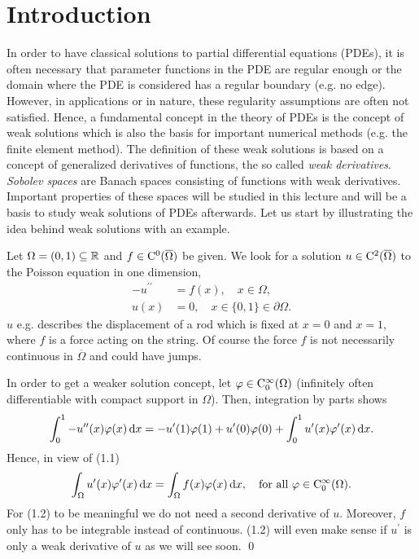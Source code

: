 \chapter{Introduction}

In order to have classical solutions to partial differential equations (PDEs), it is often necessary that parameter functions in the PDE are regular enough or the domain where the PDE is considered has a regular boundary (e.g. no edge).
However, in applications or in nature, these regularity assumptions are often not satisfied.
Hence, a fundamental concept in the theory of PDEs is the concept of weak solutions which is also the basis for important numerical methods (e.g. the finite element method).
The definition of these weak solutions is based on a concept of generalized derivatives of functions, the so called \emph{weak derivatives}. \emph{Sobolev spaces} are Banach spaces consisting of functions with weak derivatives.  
Important properties of these spaces will be studied in this lecture and will be a basis to study weak solutions of PDEs afterwards.  
Let us start by illustrating the idea behind weak solutions with an example.

\begin{ex}
  Let $\Omega = (0,1) \subseteq \mathbb{R}$ and $f \in \mathrm{C}^0(\overline \Omega)$ be given. 
  We look for a solution $u \in \mathrm{C}^2(\overline \Omega)$ to the Poisson equation in one dimension,
  \begin{align}
    -u^{\prime\prime} &= f(x), \quad x \in \Omega, \\
    u(x) &= 0, \quad x \in \{0,1\} \in \partial \Omega \nonumber.
  \end{align}
  $u$ e.g. describes the displacement of a rod which is fixed at $x = 0$ and $x = 1$, where $f$ is a force acting on the string.
  Of course the force $f$ is not necessarily continuous in $\overline\Omega$ and could have jumps.

  In order to get a weaker solution concept, let $\varphi \in \mathrm{C}_0^\infty(\Omega)$ (infinitely often differentiable with compact support in $\Omega$).
  Then, integration by parts shows
  $$
  \int_0^1 -u^{\prime\prime}(x) \varphi(x) \, {\operatorname{d}\!{x}} = -u^\prime(1) \varphi(1) + u^\prime(0)\varphi(0) + \int_0^1 u^\prime(x)\varphi^\prime(x) \, {\operatorname{d}\!{x}}.
  $$
  Hence, in view of (1.1)
  \begin{equation}
    \int_\Omega u^\prime(x)\varphi^\prime(x) \, {\operatorname{d}\!{x}} = \int_\Omega f(x)\varphi(x) \, {\operatorname{d}\!{x}}, \quad \text{for all } \varphi \in \mathrm{C}_0^\infty(\Omega).
  \end{equation}
  For (1.2) to be meaningful we do not need a second derivative of $u$.
  Moreover, $f$ only has to be integrable instead of continuous. 
  (1.2) will even make sense if $u^\prime$ is only a weak derivative of $u$ as we will see soon. \qed
\end{ex}

